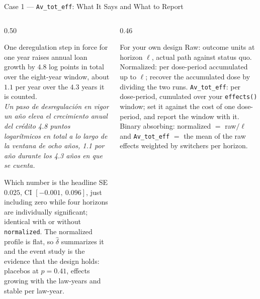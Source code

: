 \documentclass[main.tex]{subfiles}
\begin{document}
\begin{frame}{Case 1 --- \texttt{Av\_tot\_eff}: What It Says and What to Report}

  \begin{columns}[T]
    \begin{column}{0.50\textwidth}
      \begin{readbox}
        \scriptsize
        One deregulation step in force for one year raises annual loan growth
        by $4.8$ log points in total over the eight-year window, about $1.1$
        per year over the $4.3$ years it is counted.\\
        \textit{Un paso de desregulación en vigor un año eleva el crecimiento
        anual del crédito 4.8 puntos logarítmicos en total a lo largo de la
        ventana de ocho años, 1.1 por año durante los 4.3 años en que se
        cuenta.}
      \end{readbox}

      \smallskip
      \begin{block}{\footnotesize Which number is the headline}
        \footnotesize
        SE $0.025$, CI $[-0.001,\ 0.096]$, just including zero while four
        horizons are individually significant; identical with or without
        \texttt{normalized}. The normalized profile is flat, so $\hat\delta$
        summarizes it and the event study is the evidence that the design
        holds: placebos at $p = 0.41$, effects growing with the law-years and
        stable per law-year.
      \end{block}
    \end{column}
    \begin{column}{0.46\textwidth}
      \begin{block}{\footnotesize For your own design}
        \footnotesize
        Raw: outcome units at horizon $\ell$, actual path against status quo.
        Normalized: per dose-period accumulated up to $\ell$; recover the
        accumulated dose by dividing the two runs.
        \texttt{Av\_tot\_eff}: per dose-period, cumulated over your
        \texttt{effects()} window; set it against the cost of one dose-period,
        and report the window with it. Binary absorbing: normalized $=$
        raw$/\ell$ and \texttt{Av\_tot\_eff} $=$ the mean of the raw effects
        weighted by switchers per horizon.
      \end{block}
    \end{column}
  \end{columns}

\end{frame}
\end{document}

